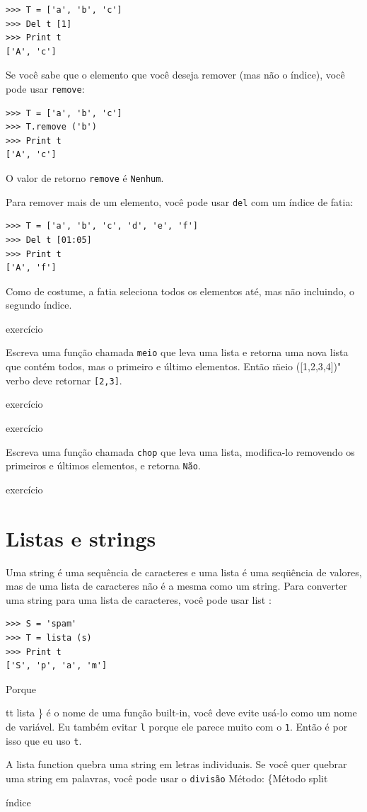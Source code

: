 \documentclass[10pt]{book}
\begin{document}
\begin{verbatim}
>>> T = ['a', 'b', 'c']
>>> Del t [1]
>>> Print t
['A', 'c']
\end{verbatim}
%

Se você sabe que o elemento que você deseja remover (mas não o índice), você
pode usar {\tt remove}:

\begin{verbatim}
>>> T = ['a', 'b', 'c']
>>> T.remove ('b')
>>> Print t
['A', 'c']
\end{verbatim}
%
O valor de retorno {\tt remove} é {\tt Nenhum}.

Para remover mais de um elemento, você pode usar {\tt del} com
um índice de fatia:

\begin{verbatim}
>>> T = ['a', 'b', 'c', 'd', 'e', ​​'f']
>>> Del t [01:05]
>>> Print t
['A', 'f']
\end{verbatim}
%
Como de costume, a fatia seleciona todos os elementos até, mas não
incluindo, o segundo índice.

\begin{} exercício

Escreva uma função chamada \verb "meio" que leva uma lista e
retorna uma nova lista que contém todos, mas o primeiro e último
elementos. Então \"meio ([1,2,3,4])" verbo deve retornar \verb "[2,3]".

\end{} exercício

\begin{} exercício

Escreva uma função chamada \verb "chop" que leva uma lista, modifica-lo
removendo os primeiros e últimos elementos, e retorna {\tt Não}.

\end{} exercício


\section{Listas e strings}

Uma string é uma sequência de caracteres e uma lista é uma seqüência
de valores, mas de uma lista de caracteres não é a mesma como um
string. Para converter uma string para uma lista de caracteres,
você pode usar {list \tt}:

\begin{verbatim}
>>> S = 'spam'
>>> T = lista (s)
>>> Print t
['S', 'p', 'a', 'm']
\end{verbatim}
%
Porque {tt lista \} é o nome de uma função built-in, você deve
evite usá-lo como um nome de variável. Eu também evitar {\tt l} porque
ele parece muito com o {\tt 1}. Então é por isso que eu uso {\tt t}.

A lista {\tt} function quebra uma string em letras individuais. Se
você quer quebrar uma string em palavras, você pode usar o {\tt divisão}
Método:
\{Método split} índice
\end{document}
